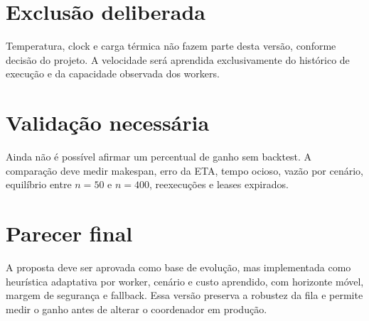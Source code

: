 \documentclass[12pt,a4paper]{article}
\begin{document}
\section{Exclusão deliberada}
Temperatura, clock e carga térmica não fazem parte desta versão, conforme decisão do projeto. A velocidade será aprendida exclusivamente do histórico de execução e da capacidade observada dos workers.

\section{Validação necessária}
Ainda não é possível afirmar um percentual de ganho sem backtest. A comparação deve medir makespan, erro da ETA, tempo ocioso, vazão por cenário, equilíbrio entre $n=50$ e $n=400$, reexecuções e leases expirados.

\section{Parecer final}
A proposta deve ser aprovada como base de evolução, mas implementada como heurística adaptativa por worker, cenário e custo aprendido, com horizonte móvel, margem de segurança e fallback. Essa versão preserva a robustez da fila e permite medir o ganho antes de alterar o coordenador em produção.
\end{document}
